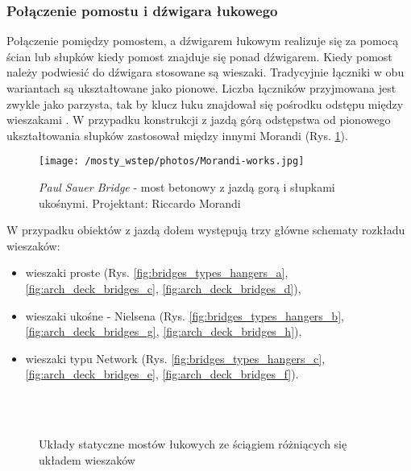 \subsubsection{Połączenie pomostu i dźwigara łukowego}
Połączenie pomiędzy pomostem, a dźwigarem łukowym realizuje się za pomocą ścian lub słupków kiedy pomost znajduje się ponad dźwigarem. Kiedy pomost należy podwiesić do dźwigara stosowane są wieszaki. Tradycyjnie łączniki w obu wariantach są ukształtowane jako pionowe. Liczba łączników przyjmowana jest zwykle jako parzysta, tak by klucz łuku znajdował się pośrodku odstępu między wieszakami \parencite{Szczygie1978}. W przypadku konstrukcji z jazdą górą odstępstwa od pionowego ukształtowania słupków zastosował między innymi Morandi (Rys. \ref{fig:bridges_morandi}). 

\begin{figure}[hbt!]
	\centering
	\texttt{[image: /mosty\_wstep/photos/Morandi-works.jpg]}
	\captionsetup{justification=centering}
	\caption{\textit{Paul Sauer Bridge} - most betonowy z jazdą gorą i słupkami ukośnymi. Projektant: Riccardo Morandi \parencite{Morandi1962}}
	\label{fig:bridges_morandi}
\end{figure}

W przypadku obiektów z jazdą dołem występują trzy główne schematy rozkładu wieszaków:
\begin{itemize}[noitemsep]
	\item wieszaki proste (Rys. \ref{fig:bridges_types_hangers_a}, \ref{fig:arch_deck_bridges_c}, \ref{fig:arch_deck_bridges_d}),
	\item wieszaki ukośne - Nielsena (Rys. \ref{fig:bridges_types_hangers_b}, \ref{fig:arch_deck_bridges_g},  \ref{fig:arch_deck_bridges_h}),
	\item wieszaki typu Network (Rys. \ref{fig:bridges_types_hangers_c}, \ref{fig:arch_deck_bridges_e}, \ref{fig:arch_deck_bridges_f}).
\end{itemize}

\begin{figure}[h]
	\centering
	  \\
	 \\
	\captionsetup{justification=centering}
	\caption{Układy statyczne mostów łukowych ze ściągiem różniących się układem wieszaków}
	\label{fig:bridges_types_hangers}
\end{figure}

